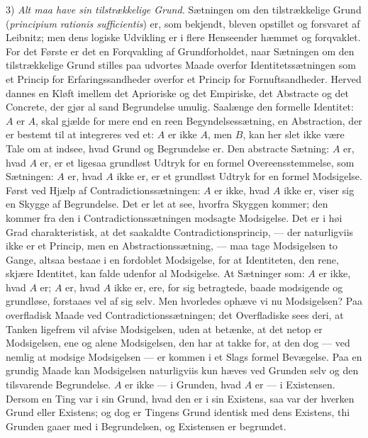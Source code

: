 \documentclass[11pt]{book}
\newcommand{\opage}[1]{\marginnote{\footnotesize\textit{[#1]}}}
\begin{document}
3) \emph{Alt maa have sin tilstrækkelige Grund.} Sætningen om den
tilstrækkelige Grund (\textit{principium rationis sufficientis})
er, som bekjendt, bleven opstillet og forsvaret af Leibnitz; men dens
logiske Udvikling er i flere Henseender hæmmet og forqvaklet. For
det Første er det en Forqvakling af Grundforholdet, naar Sætningen
om den tilstrækkelige Grund stilles paa udvortes Maade overfor
Identitetssætningen som et Princip for Erfaringssandheder overfor
et Princip for Fornuftsandheder. Herved dannes en Kløft imellem
det
\opage{100} \setcounter{footnote}{0}%
Aprioriske og det Empiriske, det Abstracte og det Concrete, der
gjør al sand Begrundelse umulig. Saalænge den formelle Identitet:
$A$ er $A$, skal gjælde for mere end en reen Begyndelsessætning, en
Abstraction, der er bestemt til at integreres ved et: $A$ er ikke
$A$, men $B$, kan her slet ikke være Tale om at indsee, hvad Grund
og Begrundelse er. Den abstracte Sætning: $A$ er, hvad $A$ er, er
et ligesaa grundløst Udtryk for en formel Overeensstemmelse, som
Sætningen: $A$ er, hvad $A$ ikke er, er et grundløst Udtryk for en
formel Modsigelse. Først ved Hjælp af Contradictionssætningen: $A$
er ikke, hvad $A$ ikke er, viser sig en Skygge af Begrundelse. Det
er let at see, hvorfra Skyggen kommer; den kommer fra den i
Contradictionssætningen modsagte Modsigelse. Det er i høi Grad
charakteristisk, at det saakaldte Contradictionsprincip, --- der
naturligviis ikke er et Princip, men en Abstractionssætning,
--- maa tage Modsigelsen to Gange, altsaa bestaae i en fordoblet
Modsigelse, for at Identiteten, den rene, skjære Identitet, kan
falde udenfor al Modsigelse. At Sætninger som: $A$ er ikke, hvad
$A$ er; $A$ er, hvad $A$ ikke er, ere, for sig betragtede, baade
modsigende og grundløse, forstaaes vel af sig selv. Men hvorledes
ophæve vi nu Modsigelsen? Paa overfladisk Maade ved
Contradictionssætningen; det Overfladiske sees deri, at Tanken
ligefrem vil afvise Modsigelsen, uden at betænke, at det netop er
Modsigelsen, ene og alene Modsigelsen, den har at takke for, at den
dog --- ved nemlig at modsige Modsigelsen --- er kommen i et Slags
formel Bevægelse. Paa en grundig Maade kan Modsigelsen
naturligviis kun hæves ved Grunden selv og den tilsvarende
Begrundelse. $A$ er ikke --- i Grunden, hvad $A$ er --- i
Existensen. Dersom en Ting var i sin Grund, hvad den er i sin
Existens, saa var der hverken Grund eller Existens; og dog er
Tingens Grund identisk med dens Existens, thi Grunden gaaer med i
Begrundelsen, og Existensen er begrundet.
\end{document}
